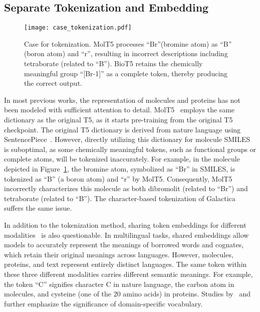 \documentclass[11pt]{article}
\newcommand{\method}{{BioT5}}
\begin{document}
\subsection{Separate Tokenization and Embedding}
\label{sec:sep_token_emb}
\begin{figure}[t]
    \centering
    \texttt{[image: case\_tokenization.pdf]}
    \caption{Case for tokenization. MolT5 processes ``Br''(bromine atom) as ``B'' (boron atom) and ``r'', resulting in incorrect descriptions including tetraborate (related to ``B''). \method{} retains the chemically meaningful group ``[Br-1]'' as a complete token, thereby producing the correct output.}
    \label{fig:case_tokenization}
\end{figure}
In most previous works, the representation of molecules and proteins has not been modeled with sufficient attention to detail.
MolT5~\citep{DBLP:conf/emnlp/EdwardsLRHCJ22} employs the same dictionary as the original T5, as it starts pre-training from the original T5 checkpoint.
The original T5 dictionary is derived from nature language using SentencePiece~\citep{DBLP:conf/emnlp/KudoR18}.
However, directly utilizing this dictionary for molecule SMILES is suboptimal, as some chemically meaningful tokens, such as functional groups or complete atoms, will be tokenized inaccurately.
For example, in the molecule depicted in Figure~\ref{fig:case_tokenization}, the bromine atom, symbolized as ``Br'' in SMILES, is tokenized as ``B'' (a boron atom) and ``r'' by MolT5.
Consequently, MolT5 incorrectly characterizes this molecule as both dibromolit (related to ``Br'') and tetraborate (related to ``B'').
The character-based tokenization of Galactica~\citep{taylor2022galactica} suffers the same issue.

In addition to the tokenization method, sharing token embeddings for different modalities~\cite{DBLP:conf/emnlp/EdwardsLRHCJ22,taylor2022galactica} is also questionable.
In multilingual tasks, shared embeddings allow models to accurately represent the meanings of borrowed words and cognates, which retain their original meanings across languages.
However, molecules, proteins, and text represent entirely distinct languages.
The same token within these three different modalities carries different semantic meanings.
For example, the token ``C'' signifies character C in nature language, the carbon atom in molecules, and cysteine (one of the $20$ amino acids) in proteins. 
Studies by~\citet{DBLP:conf/emnlp/BeltagyLC19} and~\citet{gu2021domain} further emphasize the significance of domain-specific vocabulary.
\end{document}
